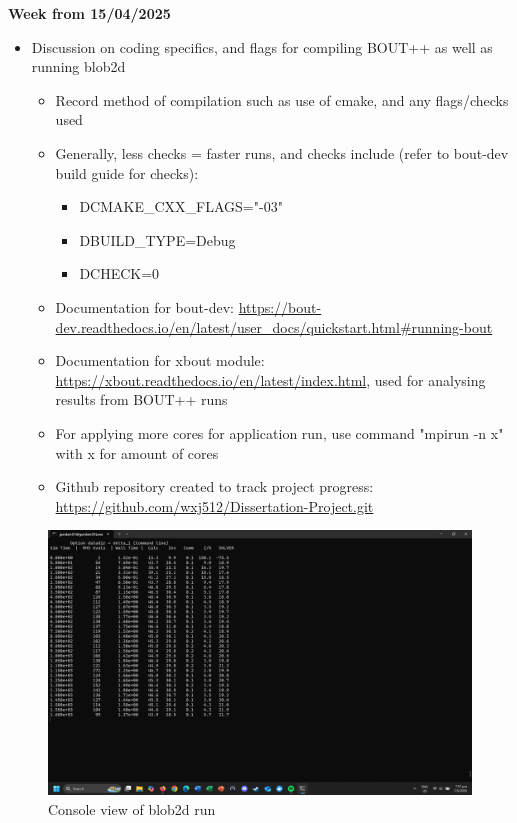 \documentclass{article}
\begin{document}
\begin{arrowlist}
    \item \textbf{Week from 15/04/2025}
    \begin{itemize}
        \item Discussion on coding specifics, and flags for compiling BOUT++ as well as running blob2d
        \begin{itemize}
            \item Record method of compilation such as use of cmake, and any flags/checks used
            \item Generally, less checks = faster runs, and checks include (refer to bout-dev build guide for checks):
            \begin{itemize}
                \item DCMAKE\_CXX\_FLAGS="-03"
                \item DBUILD\_TYPE=Debug
                \item DCHECK=0
            \end{itemize}
            \item Documentation for bout-dev: \url{https://bout-dev.readthedocs.io/en/latest/user_docs/quickstart.html#running-bout}
            \item Documentation for xbout module: \url{https://xbout.readthedocs.io/en/latest/index.html}, used for analysing results from BOUT++ runs
            \item For applying more cores for application run, use command "mpirun -n x" with x for amount of cores
            \item Github repository created to track project progress: \url{https://github.com/wxj512/Dissertation-Project.git}
        \end{itemize}
    \end{itemize}
    
    \begin{figure}[H]
    \centering
        \includegraphics[height=0.3\textheight]{./Fig/Fig1 blob2d example run.png}
        \normalsize{\caption{Console view of blob2d run}
        \label{fig:fig1}}
    \end{figure}   


\end{arrowlist}
\end{document}
